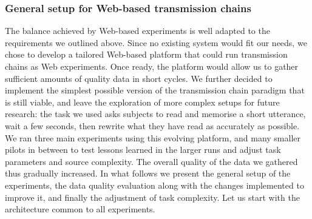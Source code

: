 
\subsubsection{General setup for Web-based transmission
chains}\label{general-setup-for-web-based-transmission-chains}

The balance achieved by Web-based experiments is well adapted to the
requirements we outlined above. Since no existing system would fit our
needs, we chose to develop a tailored Web-based platform that could run
transmission chains as Web experiments. Once ready, the platform would
allow us to gather sufficient amounts of quality data in short cycles.
We further decided to implement the simplest possible version of the
transmission chain paradigm that is still viable, and leave the
exploration of more complex setups for future research: the task we used
asks subjects to read and memorise a short utterance, wait a few
seconds, then rewrite what they have read as accurately as possible. We
ran three main experiments using this evolving platform, and many
smaller pilots in between to test lessons learned in the larger runs and
adjust task parameters and source complexity. The overall quality of the
data we gathered thus gradually increased. In what follows we present
the general setup of the experiments, the data quality evaluation along
with the changes implemented to improve it, and finally the adjustment
of task complexity. Let us start with the architecture common to all
experiments.


